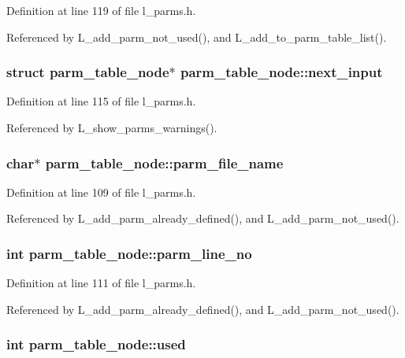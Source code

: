 Definition at line 119 of file l\_\-parms.h.

Referenced by L\_\-add\_\-parm\_\-not\_\-used(), and L\_\-add\_\-to\_\-parm\_\-table\_\-list().
\subsubsection{\setlength{\rightskip}{0pt plus 5cm}struct \bf{parm\_\-table\_\-node}$\ast$ \bf{parm\_\-table\_\-node::next\_\-input}}\label{structparm__table__node_1684352369ac2f52c016d1cd6a46bcf7}




Definition at line 115 of file l\_\-parms.h.

Referenced by L\_\-show\_\-parms\_\-warnings().
\subsubsection{\setlength{\rightskip}{0pt plus 5cm}char$\ast$ \bf{parm\_\-table\_\-node::parm\_\-file\_\-name}}\label{structparm__table__node_50a4d855bcf1f79b41c9a7ff5cb99622}




Definition at line 109 of file l\_\-parms.h.

Referenced by L\_\-add\_\-parm\_\-already\_\-defined(), and L\_\-add\_\-parm\_\-not\_\-used().
\subsubsection{\setlength{\rightskip}{0pt plus 5cm}int \bf{parm\_\-table\_\-node::parm\_\-line\_\-no}}\label{structparm__table__node_239bda54f47f2a901ee60a74cdc5fec3}




Definition at line 111 of file l\_\-parms.h.

Referenced by L\_\-add\_\-parm\_\-already\_\-defined(), and L\_\-add\_\-parm\_\-not\_\-used().
\subsubsection{\setlength{\rightskip}{0pt plus 5cm}int \bf{parm\_\-table\_\-node::used}}\label{structparm__table__node_a50cc0e5949d5980a9e2e16789bc434b}




